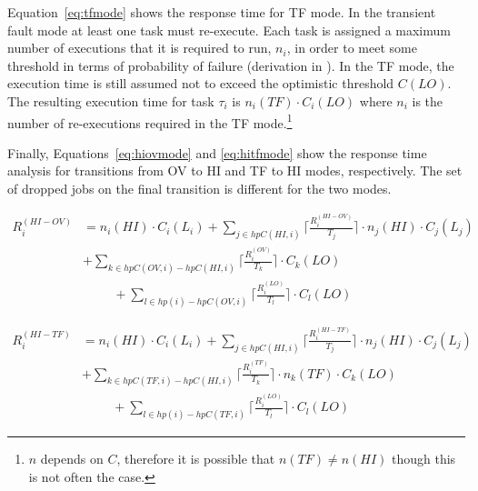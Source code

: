 	Equation~\ref{eq:tfmode} shows the response time for TF mode. 
	In the transient fault mode at least one task must re-execute. 
	Each task is assigned a maximum number of executions that it is required to run, $n_i$, in order to meet some threshold in terms of probability of failure (derivation in \cite{albayati2016modes}). 
	In the TF mode, the execution time is still assumed not to exceed the optimistic threshold $C(LO)$. 
	The resulting execution time for task $\tau_i$ is $n_i(TF) \cdot C_i(LO)$ where $n_i$ is the number of re-executions required in the TF mode.\footnote{$n$ depends on $C$, therefore it is possible that $n(TF) \ne n(HI)$ though this is not often the case.}

	Finally, Equations~\ref{eq:hiovmode} and \ref{eq:hitfmode} show the response time analysis for transitions from OV to HI and TF to HI modes, respectively. The set of dropped jobs on the final transition is different for the two modes.





\begin{equation}\label{eq:hiovmode}
\begin{aligned}
R_i^{(HI-OV)} & = n_i(HI) \cdot C_i(L_i) 
  +\sum_{j \in hpC(HI,i)}\Big\lceil\frac{R_i^{(HI-OV)}}{T_j}\Big\rceil \cdot n_j(HI) \cdot C_j(L_j) \\
&  +\sum_{k \in hpC(OV,i)-hpC(HI,i)}\Big\lceil\frac{R_i^{(OV)}}{T_k}\Big\rceil \cdot C_k(LO) \\
& \hspace{1cm}  +\sum_{l \in hp(i)-hpC(OV,i)}\Big\lceil\frac{R_i^{(LO)}}{T_l}\Big\rceil \cdot C_l(LO)
\end{aligned}
\end{equation}


\begin{equation}\label{eq:hitfmode}
\begin{aligned}
R_i^{(HI-TF)} & = n_i(HI) \cdot C_i(L_i) 
  +\sum_{j \in hpC(HI,i)}\Big\lceil\frac{R_i^{(HI-TF)}}{T_j}\Big\rceil \cdot n_j(HI) \cdot C_j(L_j) \\
&  +\sum_{k \in hpC(TF,i)-hpC(HI,i)}\Big\lceil\frac{R_i^{(TF)}}{T_k}\Big\rceil  \cdot n_k(TF) \cdot C_k(LO) \\
& \hspace{1cm}  +\sum_{l \in hp(i)-hpC(TF,i)}\Big\lceil\frac{R_i^{(LO)}}{T_l}\Big\rceil \cdot C_l(LO)
\end{aligned}
\end{equation}




